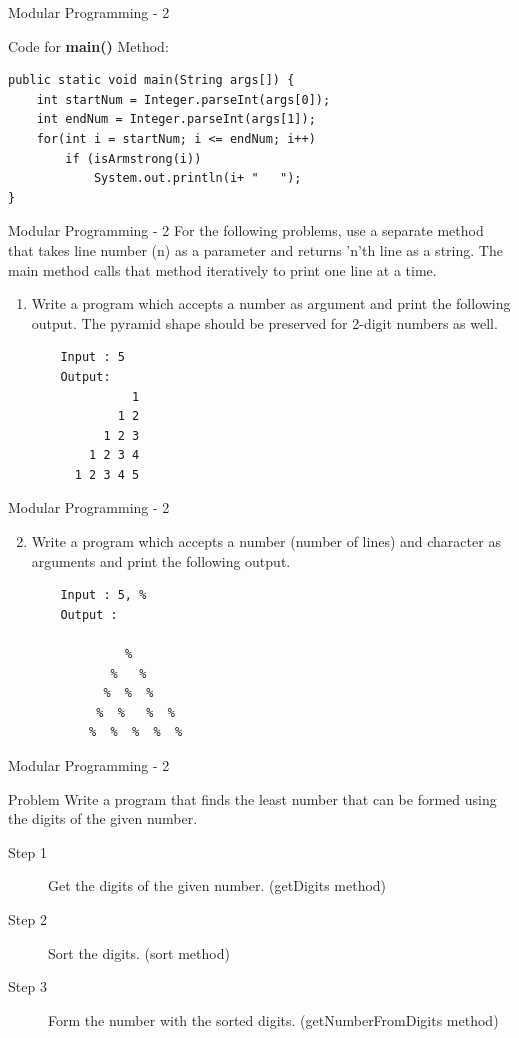 \documentclass[14pt]{beamer}
\begin{document}
\begin{frame}[fragile]{Modular Programming - 2}
\begin{block}{Code for \textbf{main()} Method:}
\begin{lstlisting}[numbers=none]
public static void main(String args[]) {
    int startNum = Integer.parseInt(args[0]);
    int endNum = Integer.parseInt(args[1]);
    for(int i = startNum; i <= endNum; i++)
        if (isArmstrong(i))
            System.out.println(i+ "   ");	
}
\end{lstlisting}
\end{block}
\end{frame}

\begin{frame}[fragile]{Modular Programming - 2}
\small
For the following problems, use a separate method that takes line number (n) as a parameter and returns 'n'th line as a string. The main method calls that method iteratively to print one line at a time. 

\begin{enumerate}
\item Write a program which accepts a number as argument and print the following output. The pyramid shape should be preserved for 2-digit numbers as well.
\begin{verbatim}
    Input : 5
    Output: 
              1
            1 2
          1 2 3
        1 2 3 4 
      1 2 3 4 5
\end{verbatim}
\end{enumerate}
\end{frame}

\begin{frame}[fragile]{Modular Programming - 2}
\begin{enumerate}
\setcounter{enumi}{1}
\item Write a program which accepts a number (number of lines) and character as arguments and print the following output. 
\begin{verbatim}
    Input : 5, %
    Output : 

             %
           %   %
          %  %  %
         %  %   %  %
        %  %  %  %  %
\end{verbatim}
\end{enumerate}
\end{frame}

\begin{frame}{Modular Programming - 2}
\begin{block}{Problem}
Write a program that finds the least number that can be formed using the digits of the given number.
\end{block}
\begin{description}
\item [Step 1] Get the digits of the given number. (getDigits method)
\item [Step 2] Sort the digits. (sort method)
\item [Step 3] Form the number with the sorted digits.  (getNumberFromDigits method)
\end{description}
\end{frame}
\end{document}
